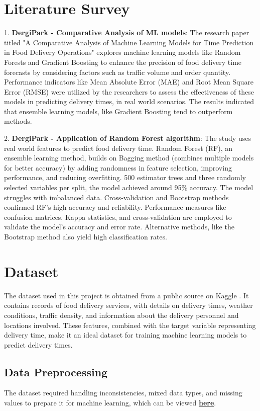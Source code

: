 \documentclass[10pt,twocolumn,letterpaper]{article}
\begin{document}
\section{Literature Survey}
1. \textbf{DergiPark - Comparative Analysis of ML models}: The research paper titled "A Comparative Analysis of Machine Learning Models for Time Prediction in Food Delivery Operations" explores machine learning models like Random Forests and Gradient Boosting to enhance the precision of food delivery time forecasts by considering factors such as traffic volume and order quantity. Performance indicators like Mean Absolute Error (MAE) and Root Mean Square Error (RMSE) were utilized by the researchers to assess the effectiveness of these models in predicting delivery times, in real world scenarios. The results indicated that ensemble learning models, like Gradient Boosting tend to outperform methods. \cite{dergipark1}

2. \textbf{DergiPark - Application of Random Forest algorithm}: The study uses real world features to predict food delivery time. Random Forest (RF), an ensemble learning method, builds on Bagging method (combines multiple models for better accuracy) by adding randomness in feature selection, improving performance, and reducing overfitting. 500 estimator trees and three randomly selected variables per split, the model achieved around 95\% accuracy. The model struggles with imbalanced data. Cross-validation and Bootstrap methods confirmed RF's high accuracy and reliability. Performance measures like confusion matrices, Kappa statistics, and cross-validation are employed to validate the model’s accuracy and error rate. Alternative methods, like the Bootstrap method also yield high classification rates. \cite{dergipark2}

\section{Dataset}
    The dataset used in this project is obtained from a public source on Kaggle \cite{kaggle}. It contains records of food delivery services, with details on delivery times, weather conditions, traffic density, and information about the delivery personnel and locations involved. These features, combined with the target variable representing delivery time, make it an ideal dataset for training machine learning models to predict delivery times.

    \subsection{Data Preprocessing}
        The dataset required handling inconsistencies, mixed data types, and missing values to prepare it for machine learning, which can be viewed \href{https://github.com/Vikranth3140/Food-Delivery-Time-Prediction/blob/main/Data%20Pre%20Processing/pre-processing.py}{\textbf{here}}.
\end{document}
